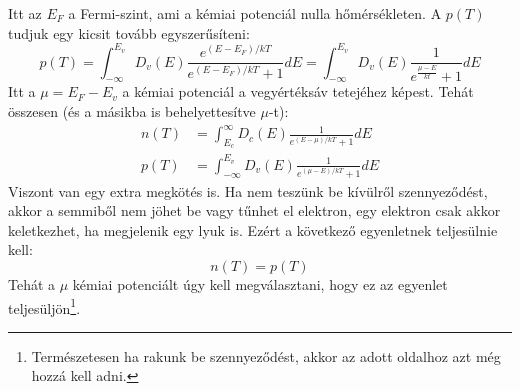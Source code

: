 \documentclass[../main.tex]{subfiles}
\begin{document}
Itt az $E_F$ a Fermi-szint, ami a kémiai potenciál nulla hőmérsékleten. A $p(T)$ tudjuk egy kicsit tovább egyszerűsíteni:
\begin{equation}
    p(T) = \int_{-\infty}^{E_v} D_v (E) \frac{e^{(E - E_F) / kT}}{e^{(E - E_F) / kT} + 1} dE = \int_{-\infty}^{E_v} D_v (E) \frac{1}{e^{\frac{\mu - E}{kt}} + 1} dE
\end{equation}
Itt a $\mu = E_F - E_v$ a kémiai potenciál a vegyértéksáv tetejéhez képest. Tehát összesen (és a másikba is behelyettesítve $\mu$-t):
\begin{equation}
    \begin{aligned}
        n(T) &= \int_{E_c}^{\infty} D_c (E) \frac{1}{e^{(E - \mu) / kT} + 1} dE \\
        p(T) &= \int_{-\infty}^{E_v} D_v (E) \frac{1}{e^{(\mu - E) / kT} + 1} dE
    \end{aligned}
\end{equation}
Viszont van egy extra megkötés is. Ha nem teszünk be kívülről szennyeződést, akkor a semmiből nem jöhet be vagy tűnhet el elektron, egy elektron csak akkor keletkezhet, ha megjelenik egy lyuk is. Ezért a következő egyenletnek teljesülnie kell:
\begin{equation}
    n(T) = p(T)
\end{equation}
Tehát a $\mu$ kémiai potenciált úgy kell megválasztani, hogy ez az egyenlet teljesüljön\footnote{
    Természetesen ha rakunk be szennyeződést, akkor az adott oldalhoz azt még hozzá kell adni.
}.
\end{document}
